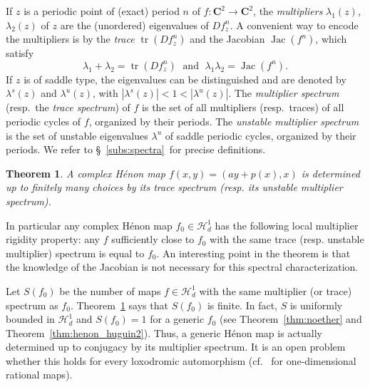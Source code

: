 \documentclass[oneside, 12pt]{amsart}
\newcommand{\abs}[1]{\left\vert#1\right\vert}
\DeclareMathOperator{\tr}{tr}
\DeclareMathOperator{\jac}{Jac}
\newcommand{\C}{\mathbf{C}}
\theoremstyle{plain}
\newtheorem{mthm}{Theorem}
\theoremstyle{definition}
\numberwithin{equation}{section}       %
\numberwithin{equation}{section}       %
\begin{document}
If $z$ is a periodic point of (exact) period $n$ of $f\colon \C^2\to \C^2$, 
the \emph{multipliers} $\lambda_1(z)$, $\lambda_2(z)$ of $z$ 
are the (unordered) eigenvalues of $Df^n_z$. 
A convenient way to encode the multipliers is by the 
 \emph{trace} $\tr(Df^n_z)$ and the Jacobian $\jac(f^n)$,
   which satisfy 
\begin{equation}
\lambda_1+\lambda_2 = \tr(Df^n_z) \; \text{ and } \;  \lambda_1\lambda_2  = \jac(f^n).
\end{equation} 
If $z$ is of saddle type, the eigenvalues can be distinguished and are   denoted by
$\lambda^s(z)$ and  $\lambda^u(z)$, with  
$\abs{\lambda^s(z)}<1<\abs{\lambda^u(z)}$.  
The \emph{multiplier spectrum}
(resp.\  the \emph{trace spectrum}) of $f$ is the set of all multipliers (resp.\  traces) of all periodic cycles of $f$, organized by their periods. The {\emph{unstable multiplier spectrum}} 
is the set of unstable eigenvalues $\lambda^u$ of saddle periodic cycles, organized by their periods.
We refer to \S~\ref{subs:spectra} for precise definitions.

\begin{mthm}\label{mthm:henon_multipliers}
A complex Hénon map $f(x,y)=(ay+p(x),x)$ 
is determined
up to finitely many choices by its trace spectrum (resp. its unstable multiplier spectrum).
\end{mthm}

 

In particular any complex Hénon map $f_0\in \mathcal H^1_d$ 
has the following local multiplier rigidity property: 
any $f$ sufficiently close to $f_0$ with the same trace 
(resp. unstable multiplier) spectrum is equal to $f_0$.  
An interesting    point in the theorem is  that the knowledge  of the Jacobian 
is not necessary for this  spectral characterization. 

Let $S(f_0)$ be the number of maps $f\in \mathcal H^1_d$ with the same multiplier (or trace) spectrum as $f_0$. 
Theorem~\ref{mthm:henon_multipliers} says that $S(f_0)$ is finite. In fact, 
$S$ is uniformly bounded in $\mathcal H^1_d$  and  $S(f_0)=1$ for a generic $f_0$ (see 
Theorem~\ref{thm:noether} and Theorem~\ref{thm:henon_huguin2}). Thus, 
    a generic Hénon map is actually 
determined up to conjugacy 
by its multiplier spectrum.  It is an open problem whether this holds for every loxodromic automorphism
(cf.~\cite[Conjecture 1.7]{ji-xie:injective} for one-dimensional rational maps). 
\end{document}
